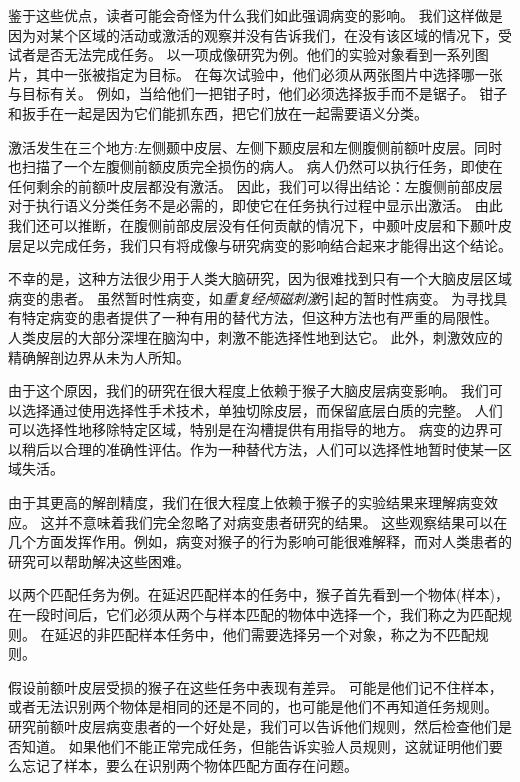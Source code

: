 \par
鉴于这些优点，读者可能会奇怪为什么我们如此强调病变的影响。
我们这样做是因为对某个区域的活动或激活的观察并没有告诉我们，在没有该区域的情况下，受试者是否无法完成任务。
以一项成像研究为例\cite{price1999delineating}。他们的实验对象看到一系列图片，其中一张被指定为目标。
在每次试验中，他们必须从两张图片中选择哪一张与目标有关。
例如，当给他们一把钳子时，他们必须选择扳手而不是锯子。
钳子和扳手在一起是因为它们能抓东西，把它们放在一起需要语义分类。


\par
激活发生在三个地方:左侧颞中皮层、左侧下颞皮层和左侧腹侧前额叶皮层。同时也扫描了一个左腹侧前额皮质完全损伤的病人\cite{price1999delineating}。
病人仍然可以执行任务，即使在任何剩余的前额叶皮层都没有激活。
因此，我们可以得出结论：左腹侧前部皮层对于执行语义分类任务不是必需的，即使它在任务执行过程中显示出激活。
由此我们还可以推断，在腹侧前部皮层没有任何贡献的情况下，中颞叶皮层和下颞叶皮层足以完成任务，我们只有将成像与研究病变的影响结合起来才能得出这个结论。


\par
不幸的是，这种方法很少用于人类大脑研究，因为很难找到只有一个大脑皮层区域病变的患者。
虽然暂时性病变，如\textit{重复经颅磁刺激}引起的暂时性病变。
为寻找具有特定病变的患者提供了一种有用的替代方法，但这种方法也有严重的局限性。
人类皮层的大部分深埋在脑沟中，刺激不能选择性地到达它。
此外，刺激效应的精确解剖边界从未为人所知。


\par
由于这个原因，我们的研究在很大程度上依赖于猴子大脑皮层病变影响。
我们可以选择通过使用选择性手术技术，单独切除皮层，而保留底层白质的完整。
人们可以选择性地移除特定区域，特别是在沟槽提供有用指导的地方。
病变的边界可以稍后以合理的准确性评估。作为一种替代方法，人们可以选择性地暂时使某一区域失活。
\par


由于其更高的解剖精度，我们在很大程度上依赖于猴子的实验结果来理解病变效应。
这并不意味着我们完全忽略了对病变患者研究的结果。
这些观察结果可以在几个方面发挥作用。例如，病变对猴子的行为影响可能很难解释，而对人类患者的研究可以帮助解决这些困难。


\par
以两个匹配任务为例。在延迟匹配样本的任务中，猴子首先看到一个物体(样本)，在一段时间后，它们必须从两个与样本匹配的物体中选择一个，我们称之为匹配规则。
在延迟的非匹配样本任务中，他们需要选择另一个对象，称之为不匹配规则。


\par
假设前额叶皮层受损的猴子在这些任务中表现有差异。
可能是他们记不住样本，或者无法识别两个物体是相同的还是不同的，也可能是他们不再知道任务规则。
研究前额叶皮层病变患者的一个好处是，我们可以告诉他们规则，然后检查他们是否知道。
如果他们不能正常完成任务，但能告诉实验人员规则，这就证明他们要么忘记了样本，要么在识别两个物体匹配方面存在问题。

